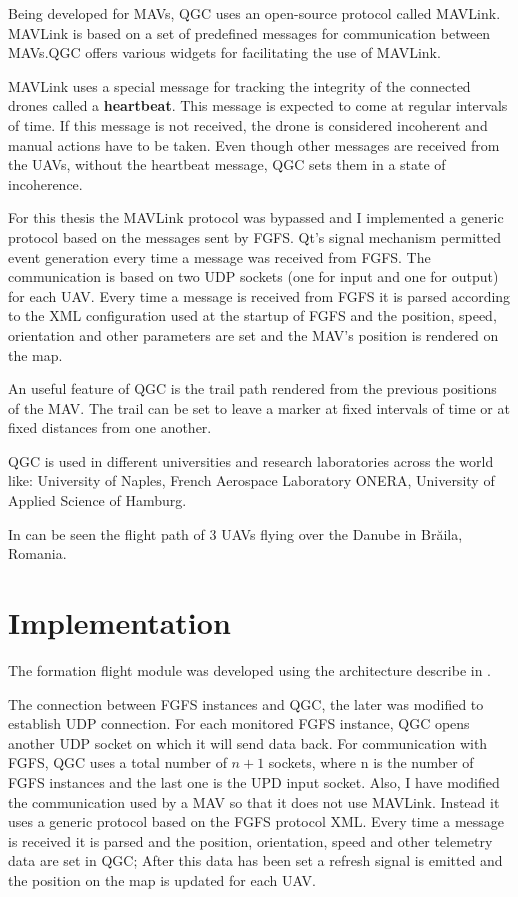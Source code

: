 Being developed for MAVs,  QGC uses
an open-source protocol called MAVLink. MAVLink is based on a set of predefined
messages for communication between MAVs.QGC offers various widgets for facilitating
the use of MAVLink.

MAVLink uses a special message for tracking the integrity of the connected drones
called a \textbf{heartbeat}. This message is expected to come at regular intervals
of time. If this message is not received, the drone is considered incoherent
and manual actions have to be taken. Even though other messages are received from
the UAVs, without the heartbeat message, QGC sets them in a state of incoherence.

For this thesis the MAVLink protocol was bypassed and I implemented a generic
protocol based on the messages sent by FGFS. Qt's signal mechanism permitted
event generation every time a message was received from FGFS. The communication
is based on two UDP sockets (one for input and one for output) for each UAV. 
Every time a message is received from FGFS it is parsed according to the XML 
configuration used at the startup of FGFS and the position, speed, orientation
and other parameters are set and the MAV's position is rendered on the map.

An useful feature of QGC is the trail path rendered from the previous positions
of the MAV. The trail can be set to leave a marker at fixed intervals of time
or at fixed distances from one another.

QGC is used in different universities and research laboratories across the world 
like: University of Naples, French Aerospace Laboratory ONERA,  University of 
Applied Science of Hamburg.

In  can be seen the flight path of 3 UAVs flying
  over the Danube in Brăila, Romania.


\section{Implementation}
\label{sec:code}

The formation flight module was developed using the architecture describe in 
.

The connection between FGFS instances and QGC, the later was modified to establish
UDP connection. For each monitored FGFS instance,  QGC opens another UDP socket
on which it will send data back. For communication with FGFS, QGC uses a total
number of $n+1$ sockets, where n is the number of FGFS instances and the last
one is the UPD input socket. Also, I have modified the communication used
by a MAV so that it does not use MAVLink. Instead it uses a generic protocol
based on the FGFS protocol XML. Every time a message is received it is parsed
and the position, orientation, speed and other telemetry data are set in 
QGC; After this data has been set a refresh signal is emitted and the position
on the map is updated for each UAV.

